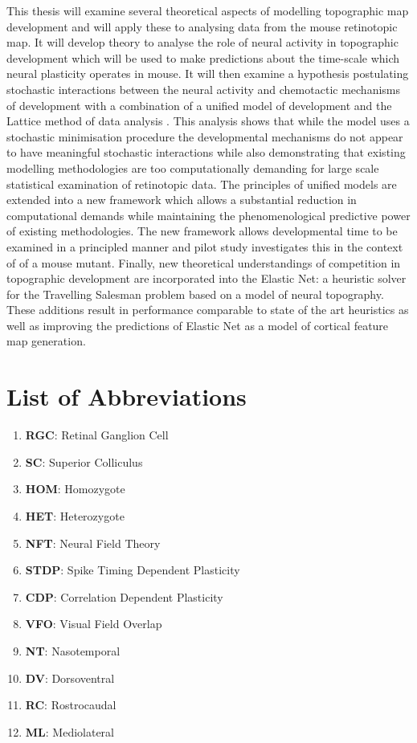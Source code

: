 This thesis will examine several theoretical aspects of modelling topographic map development and will apply these to analysing data from the mouse retinotopic map. It will develop theory to analyse the role of neural activity in topographic development which will be used to make predictions about the time-scale which neural plasticity operates in mouse. It will then examine a hypothesis postulating stochastic interactions between the neural activity and chemotactic mechanisms of development with a combination of a unified model of development and the Lattice method of data analysis \cite{Willshaw2014-ms}. This analysis shows that while the model uses a stochastic minimisation procedure the developmental mechanisms do not appear to have meaningful stochastic interactions while also demonstrating that existing modelling methodologies are too computationally demanding for large scale statistical examination of retinotopic data. The principles of unified models are extended into a new framework which allows a substantial reduction in computational demands while maintaining the phenomenological predictive power of existing methodologies. The new framework allows developmental time to be examined in a principled manner and pilot study investigates this in the context of of a mouse mutant. Finally, new theoretical understandings of competition in topographic development are incorporated into the Elastic Net: a heuristic solver for the Travelling Salesman problem based on a model of neural topography. These additions result in performance comparable to state of the art heuristics as well as improving the predictions of Elastic Net as a model of cortical feature map generation.

\section*{List of Abbreviations}
\begin{enumerate}
	\item \textbf{RGC}: Retinal Ganglion Cell
	\item \textbf{SC}: Superior Colliculus
	\item \textbf{HOM}: Homozygote
	\item \textbf{HET}: Heterozygote
	\item \textbf{NFT}: Neural Field Theory
	\item \textbf{STDP}: Spike Timing Dependent Plasticity
	\item \textbf{CDP}: Correlation Dependent Plasticity
	\item \textbf{VFO}: Visual Field Overlap
	\item \textbf{NT}: Nasotemporal
	\item \textbf{DV}: Dorsoventral
	\item \textbf{RC}: Rostrocaudal
	\item \textbf{ML}: Mediolateral
\end{enumerate}

